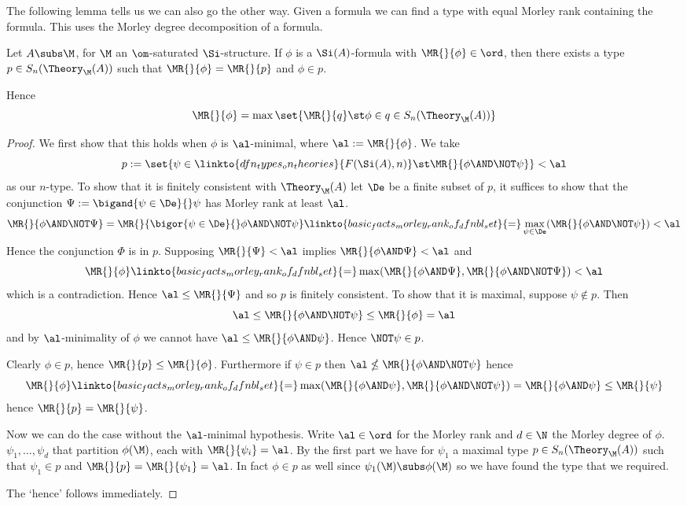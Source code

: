 The following lemma tells us we can also go the other way.
Given a formula we can find a type with equal Morley rank 
containing the formula.
This uses the Morley degree decomposition of a formula.
\begin{lem}
    Let $A \subs \M$, for $\M$ an $\om$-saturated $\Si$-structure.
    If $\phi$ is a $\Si(A)$-formula with $\MR{}{\phi} \in \ord$, 
    then there exists a type $p \in S_n(\Theory_\M(A))$ such that 
    $\MR{}{\phi} = \MR{}{p}$ and $\phi \in p$.

    Hence 
    \[\MR{}{\phi} = \max \set{\MR{}{q} \st \phi \in q \in S_n(\Theory_\M(A))}\]
\end{lem}
\begin{proof}
    We first show that this holds when $\phi$ is $\al$-minimal,
    where $\al := \MR{}{\phi}$.
    We take 
    \[
        p := \set{\psi \in \linkto{dfn_types_on_theories}{F(\Si(A),n)} 
        \st \MR{}{\phi \AND \NOT \psi}} < \al
    \]
    as our $n$-type.
    To show that it is finitely consistent with $\Theory_\M(A)$
    let $\De$ be a finite subset of $p$,
    it suffices to show that the conjunction 
    $\Psi := \bigand{\psi \in \De}{} \psi$
    has Morley rank at least $\al$.
    \[
        \MR{}{\phi \AND \NOT \Psi} = 
        \MR{}{\bigor{\psi \in \De}{} \phi \AND \NOT \psi} 
        \linkto{basic_facts_morley_rank_of_dfnbl_set}{=} 
        \max_{\psi \in \De} (\MR{}{\phi \AND \NOT \psi} ) < \al
    \]
    Hence the conjunction $\Phi$ is in $p$.
    Supposing $\MR{}{\Psi} < \al$ implies
    $\MR{}{\phi \AND \Psi} < \al$ and 
    \[
        \MR{}{\phi} \linkto{basic_facts_morley_rank_of_dfnbl_set}{=} 
        \max (\MR{}{\phi \AND \Psi}, \MR{}{\phi \AND \NOT \Psi})
        < \al
    \]
    which is a contradiction.
    Hence $\al \leq \MR{}{\Psi}$ and so $p$ is finitely consistent.
    To show that it is maximal, suppose $\psi \notin p$. Then 
    \[\al \leq \MR{}{\phi \AND \NOT \psi} \leq \MR{}{\phi} = \al\]
    and by $\al$-minimality of $\phi$ we cannot have 
    $\al \leq \MR{}{\phi \AND \psi}$.
    Hence $\NOT \psi \in p$.

    Clearly $\phi \in p$, hence $\MR{}{p} \leq \MR{}{\phi}$.
    Furthermore if $\psi \in p$ then $\al \nleq \MR{}{\phi \AND \NOT \psi}$
    hence 
    \[
        \MR{}{\phi} \linkto{basic_facts_morley_rank_of_dfnbl_set}{=} 
        \max (\MR{}{\phi \AND \psi}, \MR{}{\phi \AND \NOT \psi})
        = \MR{}{\phi \AND \psi} \leq \MR{}{\psi}
    \]
    hence $\MR{}{p} = \MR{}{\psi}$.

    Now we can do the case without the $\al$-minimal hypothesis.
    Write $\al \in \ord$ for the Morley rank and 
    $d \in \N$ the Morley degree of $\phi$.
    $\psi_1,\dots,\psi_d$ that partition $\phi(\M)$,
    each with $\MR{}{\psi_i} = \al$.
    By the first part we have for $\psi_1$ a maximal type 
    $p \in S_n(\Theory_\M(A))$ such that $\psi_1 \in p$ and 
    $\MR{}{p} = \MR{}{\psi_1} = \al$.
    In fact $\phi \in p$ as well since $\psi_1(\M) \subs \phi(\M)$
    so we have found the type that we required.

    The `hence' follows immediately.
\end{proof}

